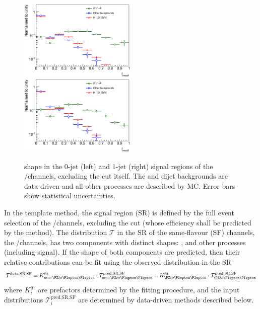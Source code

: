 \begin{figure}[t]
	\includegraphics[width=0.495\textwidth]{tex/backgrounds/frecoil_0jet}
	\hfill
	\includegraphics[width=0.495\textwidth]{tex/backgrounds/frecoil_1jet}
	\caption{\frecoil shape in the 0-jet (left) and 1-jet (right) signal regions of the 
	\eech/\mmch channels, excluding the \frecoil cut itself. The \Wjets and dijet 
	backgrounds are data-driven and all other processes are described by MC. Error bars 
	show statistical uncertainties.}
	\label{fig:dy:frecoil_shape}
\end{figure}

In the template method, the signal region (SR) is defined by the full event selection of 
the \eech/\mmch channels, excluding the \frecoil cut (whose efficiency shall be predicted 
by the method). The \frecoil distribution $\mathcal{T}$ in the SR of the same-flavour 
(SF) channels, \ie the \eech/\mmch channels, has two components with distinct shapes: 
\DYll, and other processes (including signal). If the shape of both components are 
predicted, then their relative contributions can be fit using the observed \frecoil 
distribution in the SR
\begin{equation}
	\mathcal{T}^{\text{data,SR,SF}} = K^{\text{fit}}_{\text{non-}\HepProcess{\PZ\HepTo\Plepton\Plepton}} \cdot \mathcal{T}^{\text{pred,SR,SF}}_{\text{non-}\HepProcess{\PZ\HepTo\Plepton\Plepton}} + K^{\text{fit}}_{\HepProcess{\PZ\HepTo\Plepton\Plepton}} \cdot \mathcal{T}^{\text{pred,SR,SF}}_{\HepProcess{\PZ\HepTo\Plepton\Plepton}}
	\label{eq:dy:pacman_basic}
\end{equation}
where $K^{\text{fit}}_{i}$ are prefactors determined by the fitting procedure, and the 
input distributions $\mathcal{T}^{\text{pred,SR,SF}}_{i}$ are determined by data-driven 
methods described below.

